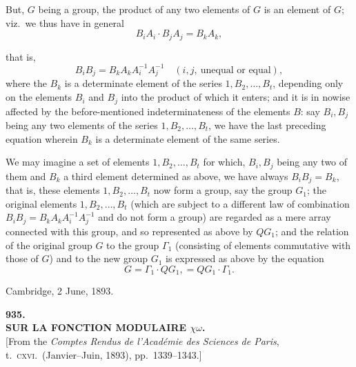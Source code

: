 \documentclass[11pt]{article}
\begin{document}
But, $G$ being a group, the product of any two elements of $G$ is an element of $G$; viz.\ we thus have in general
\[
B_i A_i\cdot B_j A_j = B_k A_k,
\]

that is,
\[
B_i B_j = B_k A_k A_i^{-1} A_j^{-1}\quad (i, j,\ \text{unequal or equal}),
\]
where the $B_k$ is a determinate element of the series $1, B_2, \ldots, B_t$, depending only on the elements $B_i$ and $B_j$ into the product of which it enters; and it is in nowise affected by the before-mentioned indeterminateness of the elements $B$: say $B_i, B_j$ being any two elements of the series $1, B_2, \ldots, B_t$, we have the last preceding equation wherein $B_k$ is a determinate element of the same series.

We may imagine a set of elements $1, B_2, \ldots, B_t$ for which, $B_i, B_j$ being any two of them and $B_k$ a third element determined as above, we have always $B_i B_j = B_k$, that is, these elements $1, B_2, \ldots, B_t$ now form a group, say the group $G_1$; the original elements $1, B_2, \ldots, B_t$ (which are subject to a different law of combination $B_i B_j = B_k A_k A_i^{-1} A_j^{-1}$ and do not form a group) are regarded as a mere array connected with this group, and so represented as above by $Q G_1$; and the relation of the original group $G$ to the group $\Gamma_1$ (consisting of elements commutative with those of $G$) and to the new group $G_1$ is expressed as above by the equation
\[
G = \Gamma_1\!\cdot\! Q G_1, = Q G_1\!\cdot\!\Gamma_1.
\]

\smallskip
\hfill Cambridge, 2 June, 1893.

\clearpage
\begin{center}
{\large\bfseries 935.}\\[0.5em]
{\large\bfseries SUR LA FONCTION MODULAIRE $\chi\omega$.}\\[0.5em]
{\small [From the \textit{Comptes Rendus de l'Acad\'emie des Sciences de Paris}, t.\ \textsc{cxvi}.\ (Janvier--Juin, 1893), pp.\ 1339--1343.]}
\end{center}
\vspace{0.5em}
\end{document}
